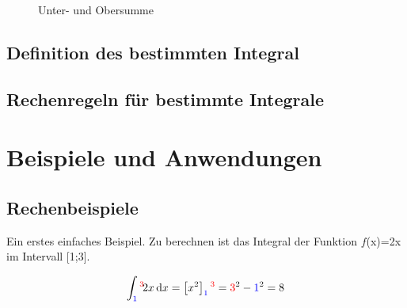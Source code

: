 \documentclass{fhnwreport} %
\begin{document}
\begin{figure}[!h]
\caption{Unter- und Obersumme}
\end{figure}

\subsection{Definition des bestimmten Integral}
\subsection{Rechenregeln für bestimmte Integrale}



\clearpage

\section{Beispiele und Anwendungen}
\subsection{Rechenbeispiele}

Ein erstes einfaches Beispiel. Zu berechnen ist das Integral der Funktion $f$(x)=2x im Intervall [\color{blue}1\color{black};\color{red}3\color{black}].

\[
\int_{\color{blue}1}^{\color{red}3} \! 2x \, \mathrm{d}x = \left[x^2\right]_{\color{blue}1}^{\color{red}3} = {\color{red}3}^2 - {\color{blue}1}^2 = 8
\]
  
\end{document}
